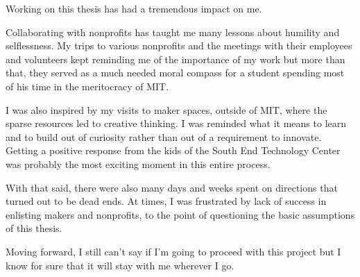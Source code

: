 Working on this thesis has had a tremendous impact on me.

Collaborating with nonprofits has taught me many lessons about humility and selflessness. My trips to various nonprofits and the meetings with their employees and volunteers kept reminding me of the importance of my work but more than that, they served as a much needed moral compass for a student spending most of his time in the meritocracy of MIT.

I was also inspired by my visits to maker spaces, outside of MIT, where the sparse resources led to creative thinking. I was reminded what it means to learn and to build out of curiosity rather than out of a requirement to innovate. Getting a positive response from the kids of the South End Technology Center was probably the most exciting moment in this entire process.

With that said, there were also many days and weeks spent on directions that turned out to be dead ends. At times, I was frustrated by lack of success in enlisting makers and nonprofits, to the point of questioning the basic assumptions of this thesis.

Moving forward, I still can't say if I'm going to proceed with this project but I know for sure that it will stay with me wherever I go.